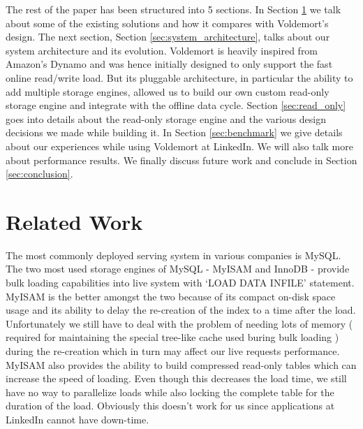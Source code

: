 \documentclass[10pt,twocolumn,preprint,natbib,authoryear]{sigplanconf}
\begin{document}
The rest of the paper has been structured into 5 sections. In Section \ref{sec:related_work} we talk about some of the existing solutions and how it compares with Voldemort's design. The next section, Section \ref{sec:system_architecture},  talks about our system architecture and its evolution. Voldemort is heavily inspired from Amazon's Dynamo\cite{5} and was hence initially designed to only support the fast online read/write load. But its pluggable architecture, in particular the ability to add multiple storage engines, allowed us to build our own custom read-only storage engine and integrate with the offline data cycle. Section \ref{sec:read_only} goes into details about the read-only storage engine and the various design decisions we made while building it. In Section \ref{sec:benchmark} we give details about our experiences while using Voldemort at LinkedIn. We will also talk more about performance results. We finally discuss future work and conclude in Section \ref{sec:conclusion}. 


\section{Related Work}
\label{sec:related_work}
The most commonly deployed serving system in various companies is MySQL. The two most used storage engines of MySQL - MyISAM and InnoDB - provide bulk loading capabilities into live system with `LOAD DATA INFILE' statement. MyISAM is the better amongst the two because of its compact on-disk space usage and its ability to delay the re-creation of the index to a time after the load\cite{6 - http://dev.mysql.com/doc/refman/5.5/en/optimizing-myisam-bulk-data-loading.html}.  Unfortunately we still have to deal with the problem of needing lots of memory ( required for maintaining the special tree-like cache used buring bulk loading \cite{http://dev.mysql.com/doc/refman/5.1/en/server-system-variables.html-sysvar_bulk_insert_buffer_size}) during the re-creation which in turn may affect our live requests performance. MyISAM also provides the ability to build compressed read-only tables \cite{7 - http://dev.mysql.com/doc/refman/5.5/en/myisampack.html} which can increase the speed of loading. Even though this decreases the load time, we still have no way to parallelize loads while also locking the complete table for the duration of the load. Obviously this doesn't work for us since applications at LinkedIn cannot have down-time. 
\end{document}
